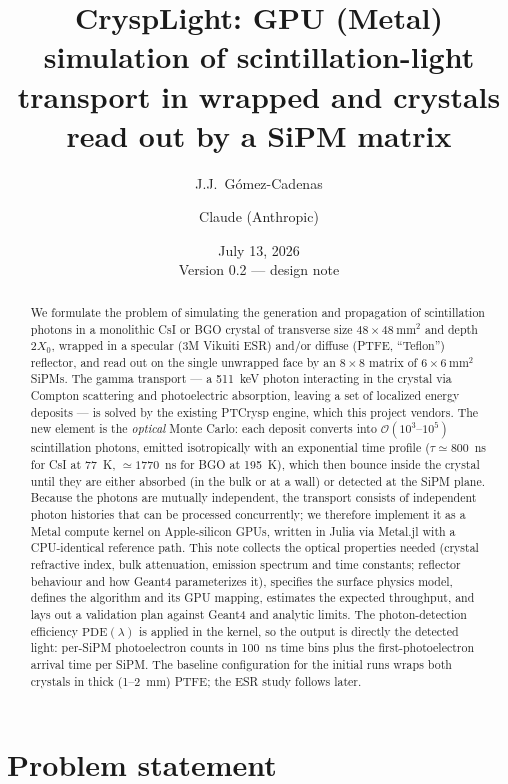 \documentclass[11pt,a4paper]{article}
\title{\textbf{CryspLight}: GPU (Metal) simulation of scintillation-light transport
in wrapped \csi{} and \bgo{} crystals read out by a SiPM matrix}
\author{J.J.~G\'omez-Cadenas \and Claude (Anthropic)}
\date{July 13, 2026 \\[2mm] \small Version 0.2 --- design note}
\newcommand{\csi}{CsI}
\newcommand{\bgo}{BGO}
\newcommand{\xzero}{X_0}
\begin{document}
\maketitle

\begin{abstract}
We formulate the problem of simulating the generation and propagation of scintillation
photons in a monolithic \csi{} or \bgo{} crystal of transverse size
$48\times48~\mathrm{mm}^2$ and depth $2\xzero$, wrapped in a specular (3M Vikuiti ESR)
and/or diffuse (PTFE, ``Teflon'') reflector, and read out on the single unwrapped face by an
$8\times8$ matrix of $6\times6~\mathrm{mm}^2$ SiPMs. The gamma transport --- a 511~keV photon
interacting in the crystal via Compton scattering and photoelectric absorption, leaving a set
of localized energy deposits --- is solved by the existing PTCrysp engine, which this project
vendors. The new element is the \emph{optical} Monte Carlo: each deposit converts into
$\mathcal{O}(10^3\text{--}10^5)$ scintillation photons, emitted isotropically with an
exponential time profile ($\tau \simeq 800$~ns for \csi{} at 77~K, $\simeq 1770$~ns for \bgo{}
at 195~K), which then bounce inside the crystal until they are either absorbed (in the bulk or
at a wall) or detected at the SiPM plane. Because the photons are mutually independent, the
transport consists of independent photon histories that can be processed concurrently;
we therefore implement it as a Metal compute kernel on
Apple-silicon GPUs, written in Julia via Metal.jl with a CPU-identical reference path. This
note collects the optical properties needed (crystal refractive index, bulk attenuation,
emission spectrum and time constants; reflector behaviour and how Geant4 parameterizes it),
specifies the surface physics model, defines the algorithm and its GPU mapping, estimates the
expected throughput, and lays out a validation plan against Geant4 and analytic limits.
The photon-detection efficiency $\mathrm{PDE}(\lambda)$ is applied in the kernel, so the
output is directly the detected light: per-SiPM photoelectron counts in 100~ns time bins plus
the first-photoelectron arrival time per SiPM. The baseline configuration for the initial
runs wraps both crystals in thick (1--2~mm) PTFE; the ESR study follows later.
\end{abstract}

\tableofcontents

\section{Problem statement}
\label{sec:problem}
\end{document}
